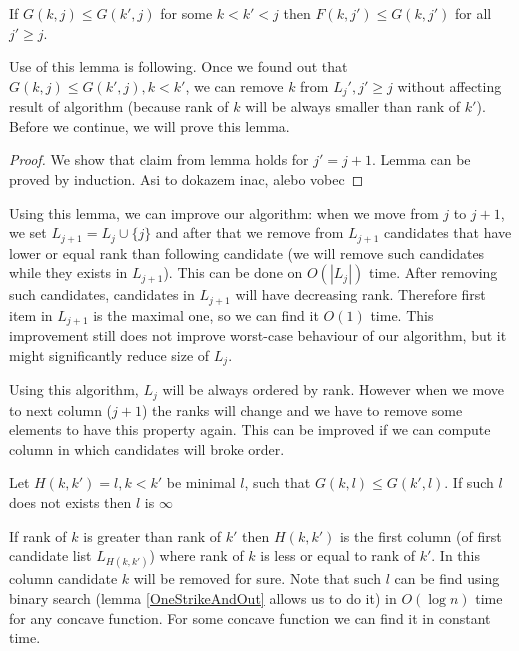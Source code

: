 \begin{lemma}\label{OneStrikeAndOut}
If $G(k,j)\leq G(k',j)$ for some $k<k'<j$ then
$F(k,j')\leq G(k,j')$ for all $j'\geq j$. 
\end{lemma}

Use of this lemma is following. Once we found out that $G(k,j)\leq
G(k',j),k<k'$, we can remove $k$ from $L_j', j'\geq j$ without affecting result
of algorithm (because rank of $k$ will be always smaller than rank of $k'$).
Before we continue, we will prove this lemma.

\begin{proof}
We show that claim from lemma holds for $j'=j+1$. Lemma can be proved by
induction. Asi to dokazem inac, alebo vobec
\end{proof}

Using this lemma, we can improve our algorithm: 
when we move from $j$ to $j+1$, we set $L_{j+1}=L_{j}\cup\{j\}$ and after that
we remove from $L_{j+1}$ candidates that have lower or equal rank than following
candidate (we will remove such candidates while they exists in $L_{j+1}$).
This can be done on $O(|L_{j}|)$ time. After removing such candidates,
candidates in $L_{j+1}$ will have decreasing rank. Therefore first item in
$L_{j+1}$ is the maximal one, so we can find it $O(1)$ time.  This improvement
still does not improve worst-case behaviour of our algorithm, but it might
significantly reduce size of $L_j$. 

Using this algorithm, $L_j$ will be always ordered by rank. However when we move
to next column ($j+1$) the ranks will change and we have to remove some elements 
to have this property again. This can be improved if we can compute column in
which  candidates will broke order.

\begin{definition}
Let $H(k,k')=l, k<k'$ be minimal $l$, such that $G(k,l)\leq G(k',l)$. If such $l$ does
not exists then $l$ is $\infty$ 
\end{definition}

If rank of $k$ is greater than rank of $k'$ then $H(k,k')$ is the first column
(of first candidate list $L_{H(k,k')}$) where rank of $k$ is less or equal to
rank of $k'$. In this column candidate $k$ will be removed for sure.  Note that
such $l$ can be find using binary search (lemma \ref{OneStrikeAndOut} allows us
to do it) in $O(\log n)$ time for any concave function. For some concave
function we can find it in constant time.

